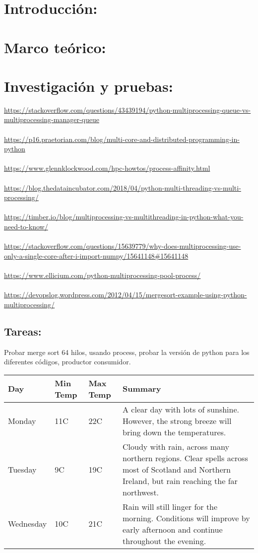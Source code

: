 \section{Introducci\'on:}
\section{Marco te\'orico:}
\section{Investigaci\'on y pruebas:}
\url{https://stackoverflow.com/questions/43439194/python-multiprocessing-queue-vs-multiprocessing-manager-queue}\\\\
\url{https://p16.praetorian.com/blog/multi-core-and-distributed-programming-in-python}\\\\
\url{https://www.glennklockwood.com/hpc-howtos/process-affinity.html}\\\\
\url{https://blog.thedataincubator.com/2018/04/python-multi-threading-vs-multi-processing/}\\\\
\url{https://timber.io/blog/multiprocessing-vs-multithreading-in-python-what-you-need-to-know/}\\\\
\url{https://stackoverflow.com/questions/15639779/why-does-multiprocessing-use-only-a-single-core-after-i-import-numpy/15641148#15641148}\\\\
\url{https://www.ellicium.com/python-multiprocessing-pool-process/}\\\\
\url{https://devopslog.wordpress.com/2012/04/15/mergesort-example-using-python-multiprocessing/}
\subsection{Tareas:}
Probar merge sort 64 hilos, usando process, probar la versi\'on de python para los diferentes c\'odigos, productor consumidor.
\begin{center}
    \begin{tabular}{ | l | l | l | p{5cm} |}
    \hline
    Day & Min Temp & Max Temp & Summary \\ \hline
    Monday & 11C & 22C & A clear day with lots of sunshine.
    However, the strong breeze will bring down the temperatures. \\ \hline
    Tuesday & 9C & 19C & Cloudy with rain, across many northern regions. Clear spells
    across most of Scotland and Northern Ireland,
    but rain reaching the far northwest. \\ \hline
    Wednesday & 10C & 21C & Rain will still linger for the morning.
    Conditions will improve by early afternoon and continue
    throughout the evening. \\
    \hline
    \end{tabular}
\end{center}

